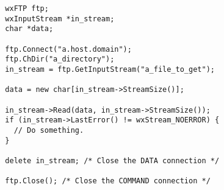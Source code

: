 
\begin{verbatim}
  wxFTP ftp;
  wxInputStream *in_stream;
  char *data;

  ftp.Connect("a.host.domain");
  ftp.ChDir("a_directory");
  in_stream = ftp.GetInputStream("a_file_to_get");

  data = new char[in_stream->StreamSize()];

  in_stream->Read(data, in_stream->StreamSize());
  if (in_stream->LastError() != wxStream_NOERROR) {
    // Do something.
  }

  delete in_stream; /* Close the DATA connection */

  ftp.Close(); /* Close the COMMAND connection */
\end{verbatim}



